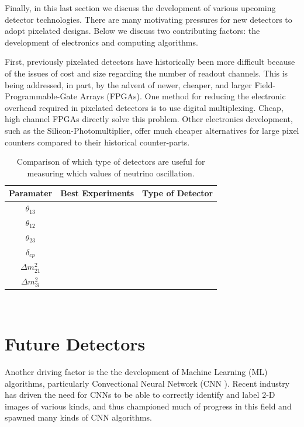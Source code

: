 Finally, in this last section we discuss the development of various upcoming detector technologies.
There are many motivating pressures for new detectors to adopt pixelated designs. 
Below we discuss two contributing factors: the development of electronics and computing algorithms.

First, previously pixelated detectors have historically been more difficult because of the issues of cost and size regarding the number of readout channels.
This is being addressed, in part, by the advent of newer, cheaper, and larger Field-Programmable-Gate Arrays (FPGAs).
One method for reducing the electronic overhead required in pixelated detectors is to use digital multiplexing.
Cheap, high channel FPGAs directly solve this problem. 
Other electronics development, such as the Silicon-Photomultiplier, offer much cheaper alternatives for large pixel counters compared to their historical counter-parts.

\begin{table}
\begin{center}
\begin{tabular}{||c c c||}
 \hline
 Paramater & Best Experiments & Type of Detector \\ [0.5ex]
 \hline\hline
  $\theta_{13}$ & & \\
 \hline
  $\theta_{12}$ & & \\
 \hline
  $\theta_{23}$ & & \\
 \hline
  $\delta_{cp}$ & & \\
 \hline
  $\Delta m_{21}^{2}$ & & \\
 \hline
  $\Delta m_{3l}^{2}$ & & \\
 \hline
\end{tabular}
\caption{Comparison of which type of detectors are useful for measuring which values of neutrino oscillation.}
\end{center}
\end{table}
~\label{table:pmns_detectors}

\section{Future Detectors}

\citep{Sadowski_2017}
Another driving factor is the the development of Machine Learning (ML) algorithms, particularly Convectional Neural Network (CNN \citep{Sadowski2017DeepLI}).
Recent industry has driven the need for CNNs to be able to correctly identify and label 2-D images of various kinds, and thus championed much of progress in this field and spawned many kinds of CNN algorithms.

